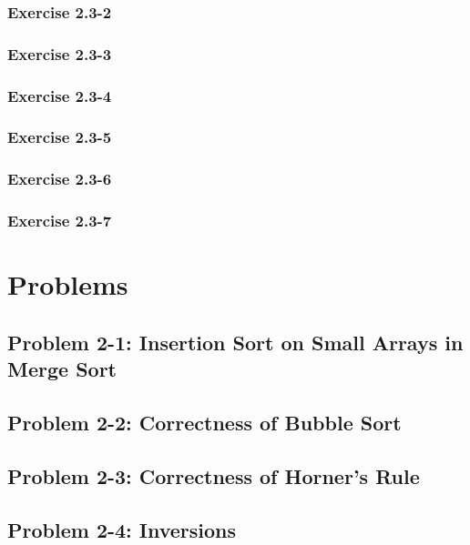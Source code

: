\documentclass{article}
\begin{document}
\subsubsection*{Exercise 2.3-2}

\subsubsection*{Exercise 2.3-3}

\subsubsection*{Exercise 2.3-4}

\subsubsection*{Exercise 2.3-5}

\subsubsection*{Exercise 2.3-6}

\subsubsection*{Exercise 2.3-7}


\section*{Problems}
\subsection*{Problem 2-1: Insertion Sort on Small Arrays in Merge Sort}

\subsection*{Problem 2-2: Correctness of Bubble Sort}

\subsection*{Problem 2-3: Correctness of Horner's Rule}

\subsection*{Problem 2-4: Inversions}
\end{document}
